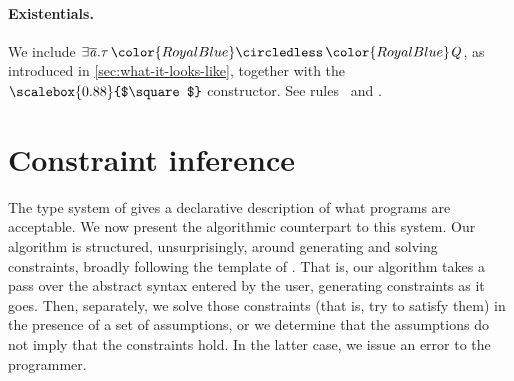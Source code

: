 \documentclass[acmsmall,usenames,dvipsnames,natbib=false,acmthm=false,screen]{acmart}
\newcommand{\info}[2][1=]{}
\newcommand{\constraintcolour}{\color{RoyalBlue}}
\newcommand{\constraintfont}[1]{{\constraintcolour#1}}
\newcommand{\RLolly}{\mathop{\constraintfont \circledless}}
\newcommand{\packbox}{\raisebox{-0.08ex}{\scalebox{0.88}{$\square$}}}
\theoremstyle{acmplain}
\theoremstyle{acmdefinition}
\begin{document}
\paragraph{Existentials.}
 We include $  \exists   \overline{\ottmv{a} } .  \tau  \RLolly   \constraintfont{ \ottnt{Q} }   $, as
  introduced in \cref{sec:what-it-looks-like}, together with
  the $\packbox$ constructor. See rules~ and
  .
\info{No substitution on $  \constraintfont{ \ottnt{Q_{{\mathrm{1}}}} }  $ in the E-Unpack rule, because there is
  only existential quantification.}

\section{Constraint inference}
\label{sec:type-inference}

The type system of  gives a declarative description
of what programs are acceptable. We now present the algorithmic counterpart to
this system. Our algorithm is structured, unsurprisingly, around generating and
solving constraints, broadly following the template of
\citet{essence-of-ml-type-inference}.
That is, our algorithm takes a pass over the abstract syntax entered by the
user, generating constraints as it goes. Then, separately, we solve those
constraints (that is, try to satisfy them) in the presence of a set of assumptions,
or we determine that the assumptions do not imply that the constraints hold. In the
latter case, we issue an error to the programmer.
\end{document}
